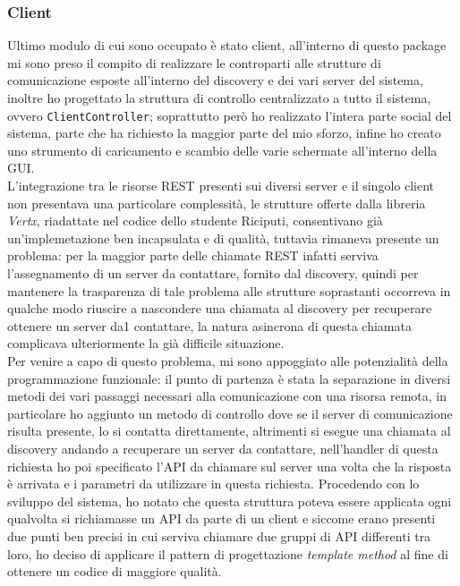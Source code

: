 \subsubsection{\textbf{Client}}
Ultimo modulo di cui sono occupato è stato client, all'interno di questo package mi sono preso il compito di realizzare le controparti alle strutture di comunicazione esposte all'interno del discovery e dei vari server del sistema, inoltre ho progettato la struttura di controllo centralizzato a tutto il sistema, ovvero \texttt{ClientController}; soprattutto però ho realizzato l'intera parte social del sistema, parte che ha richiesto la maggior parte del mio sforzo, infine ho creato uno strumento di caricamento e scambio delle varie schermate all'interno della GUI.\\
L'integrazione tra le risorse REST presenti sui diversi server e il singolo client non presentava una particolare complessità, le strutture offerte dalla libreria \textit{Vertx}, riadattate nel codice dello studente Riciputi, consentivano già un'implemetazione ben incapsulata e di qualità, tuttavia rimaneva presente un problema: per la maggior parte delle chiamate REST infatti serviva l'assegnamento di un server da contattare, fornito dal discovery, quindi per mantenere la trasparenza di tale problema alle strutture soprastanti occorreva in qualche modo riuscire a nascondere una chiamata al discovery per recuperare ottenere un server da1 contattare, la natura asincrona di questa chiamata complicava ulteriormente la già difficile situazione.\\
Per venire a capo di questo problema, mi sono appoggiato alle potenzialità della programmazione funzionale: il punto di partenza è stata la separazione in diversi metodi dei vari passaggi necessari alla comunicazione con una risorsa remota, in particolare ho aggiunto un metodo di controllo dove se il server di comunicazione risulta presente, lo si contatta direttamente, altrimenti si esegue una chiamata al discovery andando a recuperare un server da contattare, nell'handler di questa richiesta ho poi specificato l'API da chiamare sul server una volta che la risposta è arrivata e i parametri da utilizzare in questa richiesta.
Procedendo con lo sviluppo del sistema, ho notato che questa struttura poteva essere applicata ogni qualvolta si richiamasse un API da parte di un client e siccome erano presenti due punti ben precisi in cui serviva chiamare due gruppi di API differenti tra loro, ho deciso di applicare il pattern di progettazione \textit{template method} al fine di ottenere un codice di maggiore qualità.\\

